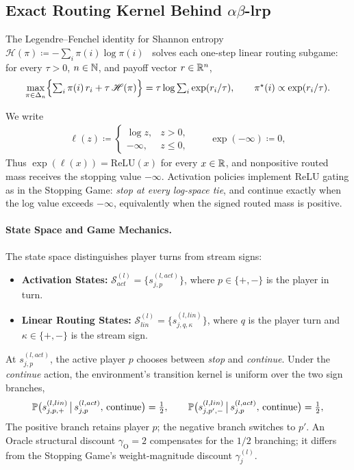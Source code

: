 \subsection{Exact Routing Kernel Behind \texorpdfstring{$\alpha\beta$-\ac{lrp}}{alpha-beta LRP}}\label{ptnb:app:routing-kernel}

The Legendre--Fenchel identity for Shannon entropy $\mathcal{H}(\pi) \coloneqq
    -\sum_i \pi(i)\log\pi(i)$~\parencite{BoydVandenberghe2004} solves each one-step linear routing subgame:
for every $\tau>0$, $n\in\NN$, and payoff vector $r \in \RR^n$,
\begin{align}\label{ptnb:eq:gibbs-lse}
    \max_{\pi \in \Delta_n} \Bigl\{ \textstyle\sum_{i} \pi(i)\, r_i + \tau\, \mathcal{H}(\pi) \Bigr\}
    = \tau \log \textstyle\sum_{i} \exp(r_i/\tau),
    \qquad \pi^\star(i) \propto \exp(r_i/\tau).
\end{align}

We write
\begin{align}
    \ell(z) \coloneqq
    \begin{cases}
        \log z, & z > 0, \\
        -\infty, & z \le 0,
    \end{cases}
    \qquad \exp(-\infty) \coloneqq 0,
\end{align}
Thus $\exp(\ell(x)) = \text{ReLU}(x)$ for every $x \in \RR$, and nonpositive routed mass receives
the stopping value $-\infty$. Activation policies implement ReLU gating as in the Stopping Game:
\emph{stop at every log-space tie}, and continue exactly when the log value exceeds $-\infty$,
equivalently when the signed routed mass is positive.

\paragraph{State Space and Game Mechanics.}
The state space distinguishes player turns from stream signs:
\begin{itemize}
    \item \textbf{Activation States:} $\mathcal{S}_{act}^{(l)} = \{ s_{j,p}^{(l, act)} \}$, where $p \in
            \{+,-\}$ is the player in turn.
    \item \textbf{Linear Routing States:} $\mathcal{S}_{lin}^{(l)} = \{ s_{j,q,\kappa}^{(l, lin)} \}$, where
        $q$ is the player turn and $\kappa \in \{+,-\}$ is the stream sign.
\end{itemize}
At $s_{j,p}^{(l, act)}$, the active player $p$ chooses between \emph{stop} and \emph{continue}.
Under the \emph{continue} action, the environment's transition kernel is uniform over the two sign
branches,
\begin{align}
    \P\bigl(s_{j,p,+}^{(l, lin)} \,\big|\, s_{j,p}^{(l, act)},\, \mathrm{continue}\bigr) =
    \tfrac{1}{2},
    \qquad
    \P\bigl(s_{j,p',-}^{(l, lin)} \,\big|\, s_{j,p}^{(l, act)},\, \mathrm{continue}\bigr) =
    \tfrac{1}{2},
\end{align}
The positive branch retains player $p$; the negative branch switches to $p'$. An Oracle structural
discount $\gamma_{\mathrm{O}} = 2$ compensates for the $1/2$ branching; it differs from the
Stopping Game's weight-magnitude discount $\gamma_j^{(l)}$.

